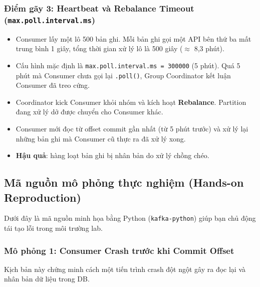 \documentclass[12pt]{article}
\begin{document}
\subsubsection{Điểm gãy 3: Heartbeat và Rebalance Timeout (\texttt{max.poll.interval.ms})}
\begin{itemize}
    \item Consumer lấy một lô 500 bản ghi. Mỗi bản ghi gọi một API bên thứ ba mất trung bình 1 giây, tổng thời gian xử lý lô là 500 giây ($\approx$ 8,3 phút).
    \item Cấu hình mặc định là \texttt{max.poll.interval.ms = 300000} (5 phút). Quá 5 phút mà Consumer chưa gọi lại \texttt{.poll()}, Group Coordinator kết luận Consumer đã treo cứng.
    \item Coordinator kick Consumer khỏi nhóm và kích hoạt \textbf{Rebalance}. Partition đang xử lý dở được chuyển cho Consumer khác.
    \item Consumer mới đọc từ offset commit gần nhất (từ 5 phút trước) và xử lý lại những bản ghi mà Consumer cũ thực ra đã xử lý xong.
    \item \textbf{Hậu quả}: hàng loạt bản ghi bị nhân bản do xử lý chồng chéo.
\end{itemize}

\subsection{Mã nguồn mô phỏng thực nghiệm (Hands-on Reproduction)}

Dưới đây là mã nguồn minh họa bằng Python (\texttt{kafka-python}) giúp bạn chủ động tái tạo lỗi trong môi trường lab.

\subsubsection{Mô phỏng 1: Consumer Crash trước khi Commit Offset}

Kịch bản này chứng minh cách một tiến trình crash đột ngột gây ra đọc lại và nhân bản dữ liệu trong DB.
\end{document}
